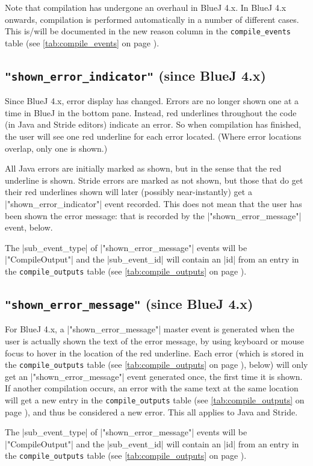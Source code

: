 \documentclass{report}
\newcommand{\myref}[1]{\autoref{#1} on page \pageref*{#1}}
\newcommand{\tabref}[1]{\lstinline|#1| table (see \myref{tab:#1})}
\begin{document}
Note that compilation has undergone an overhaul in BlueJ 4.x.  In BlueJ 4.x onwards, compilation is performed
automatically in a number of different cases.  This is/will be documented in the new
reason column in the \tabref{compile_events}.

\subsection{\lstinline!"shown_error_indicator"! (since BlueJ 4.x)}

Since BlueJ 4.x, error display has changed.  Errors
are no longer shown one at a time in BlueJ in the bottom pane.  Instead, red underlines
throughout the code (in Java and Stride editors) indicate an error.  So when compilation
has finished, the user will see one red underline for each error located.  (Where error locations
overlap, only one is shown.)

All Java errors are initially marked as shown, but in the sense that the red underline is shown.
Stride errors are marked as not shown, but those that do get their red underlines shown will later (possibly near-instantly)
get a |"shown_error_indicator"| event recorded.  This does not mean that the user has been shown
the error message: that is recorded by the |"shown_error_message"| event, below.

The |sub_event_type| of |"shown_error_message"| events will be |"CompileOutput"| and the |sub_event_id|
will contain an |id| from an entry in the \tabref{compile_outputs}.

\subsection{\lstinline!"shown_error_message"! (since BlueJ 4.x)}

For BlueJ 4.x, a |"shown_error_message"| master event is generated when the user is
actually shown the text of the error message, by using keyboard or mouse focus to hover in
the location of the red underline.  Each error (which is stored in the \tabref{compile_outputs}, below)
will only get an |"shown_error_message"| event generated once, the first time it is shown.  If another
compilation occurs, an error with the same text at the same location will get a new entry in the
\tabref{compile_outputs}, and thus be considered a new error.  This all applies to Java and Stride.

The |sub_event_type| of |"shown_error_message"| events will be |"CompileOutput"| and the |sub_event_id|
will contain an |id| from an entry in the \tabref{compile_outputs}.
\end{document}
